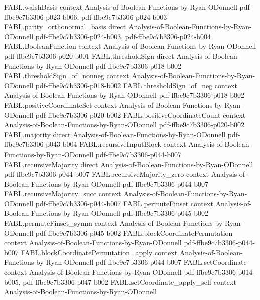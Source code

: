 \begin{theorem}
\proofstep
  {FABL.walshBasis}
  {context}
  {Analysis-of-Boolean-Functions-by-Ryan-ODonnell}
  {pdf-ffbe9c7b3306-p023-b006,
    pdf-ffbe9c7b3306-p024-b003}
\proofstep
  {FABL.parity_orthonormal_basis}
  {direct}
  {Analysis-of-Boolean-Functions-by-Ryan-ODonnell}
  {pdf-ffbe9c7b3306-p024-b003,
    pdf-ffbe9c7b3306-p024-b004}
\proofstep
  {FABL.BooleanFunction}
  {context}
  {Analysis-of-Boolean-Functions-by-Ryan-ODonnell}
  {pdf-ffbe9c7b3306-p020-b001}
\proofstep
  {FABL.thresholdSign}
  {direct}
  {Analysis-of-Boolean-Functions-by-Ryan-ODonnell}
  {pdf-ffbe9c7b3306-p018-b002}
\proofstep
  {FABL.thresholdSign_of_nonneg}
  {context}
  {Analysis-of-Boolean-Functions-by-Ryan-ODonnell}
  {pdf-ffbe9c7b3306-p018-b002}
\proofstep
  {FABL.thresholdSign_of_neg}
  {context}
  {Analysis-of-Boolean-Functions-by-Ryan-ODonnell}
  {pdf-ffbe9c7b3306-p018-b002}
\proofstep
  {FABL.positiveCoordinateSet}
  {context}
  {Analysis-of-Boolean-Functions-by-Ryan-ODonnell}
  {pdf-ffbe9c7b3306-p020-b002}
\proofstep
  {FABL.positiveCoordinateCount}
  {context}
  {Analysis-of-Boolean-Functions-by-Ryan-ODonnell}
  {pdf-ffbe9c7b3306-p020-b002}
\proofstep
  {FABL.majority}
  {direct}
  {Analysis-of-Boolean-Functions-by-Ryan-ODonnell}
  {pdf-ffbe9c7b3306-p043-b004}
\proofstep
  {FABL.recursiveInputBlock}
  {context}
  {Analysis-of-Boolean-Functions-by-Ryan-ODonnell}
  {pdf-ffbe9c7b3306-p044-b007}
\proofstep
  {FABL.recursiveMajority}
  {direct}
  {Analysis-of-Boolean-Functions-by-Ryan-ODonnell}
  {pdf-ffbe9c7b3306-p044-b007}
\proofstep
  {FABL.recursiveMajority_zero}
  {context}
  {Analysis-of-Boolean-Functions-by-Ryan-ODonnell}
  {pdf-ffbe9c7b3306-p044-b007}
\proofstep
  {FABL.recursiveMajority_succ}
  {context}
  {Analysis-of-Boolean-Functions-by-Ryan-ODonnell}
  {pdf-ffbe9c7b3306-p044-b007}
\proofstep
  {FABL.permuteFinset}
  {context}
  {Analysis-of-Boolean-Functions-by-Ryan-ODonnell}
  {pdf-ffbe9c7b3306-p045-b002}
\proofstep
  {FABL.permuteFinset_symm}
  {context}
  {Analysis-of-Boolean-Functions-by-Ryan-ODonnell}
  {pdf-ffbe9c7b3306-p045-b002}
\proofstep
  {FABL.blockCoordinatePermutation}
  {context}
  {Analysis-of-Boolean-Functions-by-Ryan-ODonnell}
  {pdf-ffbe9c7b3306-p044-b007}
\proofstep
  {FABL.blockCoordinatePermutation_apply}
  {context}
  {Analysis-of-Boolean-Functions-by-Ryan-ODonnell}
  {pdf-ffbe9c7b3306-p044-b007}
\proofstep
  {FABL.setCoordinate}
  {context}
  {Analysis-of-Boolean-Functions-by-Ryan-ODonnell}
  {pdf-ffbe9c7b3306-p014-b005,
    pdf-ffbe9c7b3306-p047-b002}
\proofstep
  {FABL.setCoordinate_apply_self}
  {context}
  {Analysis-of-Boolean-Functions-by-Ryan-ODonnell}

\end{theorem}
